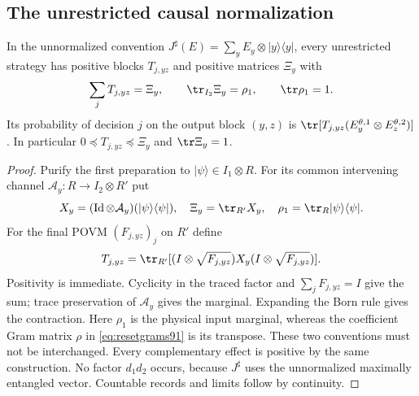 \subsection{The unrestricted causal normalization}
\begin{proposition}\label{prop:causalnormal91}
In the unnormalized convention
$J^\sharp(E)=\sum_yE_y\otimes|y\rangle\langle y|$, every unrestricted
strategy has positive blocks $T_{j,yz}$ and positive matrices $\Xi_y$ with
\begin{equation}\label{eq:causalnormal91}
 \sum_jT_{j,yz}=\Xi_y,\qquad
 \tr_{I_2}\Xi_y=\rho_1,\qquad\tr\rho_1=1.
\end{equation}
Its probability of decision $j$ on the output block $(y,z)$ is
$\tr[T_{j,yz}(E_y^{\theta,1}\otimes E_z^{\theta,2})]$.
In particular $0\preceq T_{j,yz}\preceq\Xi_y$ and $\tr\Xi_y=1$.
\end{proposition}
\begin{proof}
Purify the first preparation to $|\psi\rangle\in I_1\otimes R$.
For its common intervening channel $\mathcal A_y:R\to I_2\otimes R'$
put
\[
 X_y=(\operatorname{Id}\otimes\mathcal A_y)(|\psi\rangle\langle\psi|),
 \quad\Xi_y=\tr_{R'}X_y,\quad\rho_1=\tr_R|\psi\rangle\langle\psi|.
\]
For the final POVM $(F_{j,yz})_j$ on $R'$ define
\[
 T_{j,yz}=\tr_{R'}[(I\otimes\sqrt{F_{j,yz}})X_y
                              (I\otimes\sqrt{F_{j,yz}})].
\]
Positivity is immediate.  Cyclicity in the traced factor and
$\sum_jF_{j,yz}=I$ give the sum; trace preservation of $\mathcal A_y$
gives the marginal.  Expanding the Born rule gives the contraction.
Here $\rho_1$ is the physical input marginal, whereas the coefficient
Gram matrix $\rho$ in \eqref{eq:resetgrams91} is its transpose.
These two conventions must not be interchanged.  Every complementary
effect is positive by the same construction.  No factor $d_1d_2$
occurs, because $J^\sharp$ uses the unnormalized maximally entangled
vector.  Countable records and limits follow by continuity.
\end{proof}
